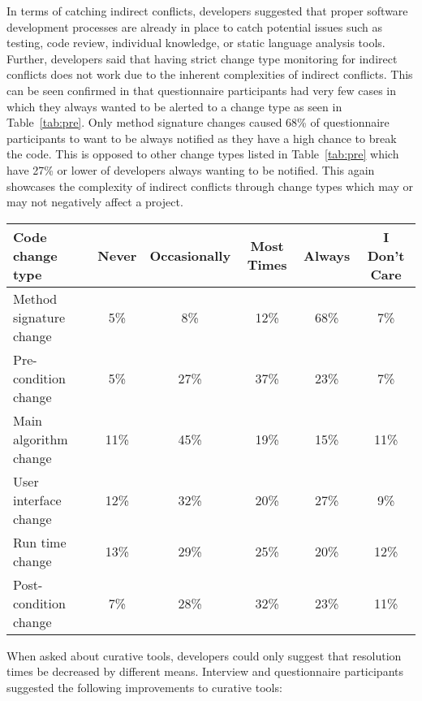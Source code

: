 In terms of catching indirect conflicts, developers suggested that proper software development processes
are already in place to catch potential issues such as testing, code review,
individual knowledge, or static language analysis tools. Further, developers said that having strict change type monitoring
for indirect conflicts does not work due to the inherent complexities of indirect conflicts.
This can be seen confirmed in that questionnaire participants had very few cases in which they always wanted to be
alerted to a change type as seen in Table~\ref{tab:pre}. Only method signature changes caused 68\% of questionnaire participants
to want to be always notified as they have a high chance to break the code. This is opposed to other change types listed in
Table~\ref{tab:pre} which have 27\% or lower of developers always wanting to be notified. This again showcases the
complexity of indirect conflicts through change types which may or may not negatively affect a project.

\begin{table*}[tb!]
\begin{center}
\begin{tabular}{| p{3cm} | c | c | c | c | c |}
\hline
Code change type &Never  & Occasionally & Most Times & Always & I Don't Care \\
\hline
\hline
Method signature change & 5\% & 8\% & 12\% & 68\% & 7\% \\ \hline
Pre-condition change & 5\% & 27\% & 37\% & 23\% & 7\% \\ \hline
Main algorithm change & 11\% & 45\% & 19\% & 15\% & 11\% \\ \hline
User interface change & 12\% & 32\% & 20\% & 27\% & 9\% \\ \hline
Run time change & 13\% & 29\% & 25\% & 20\% & 12\% \\ \hline
Post-condition change & 7\% & 28\% & 32\% & 23\% & 11\% \\ \hline
\end{tabular}
\end{center}
\caption{Questionnaire results about source code changes that developers deem notification worthy, in terms of percentage
of questionnaire participants.\label{tab:pre}}
\end{table*}

When asked about curative tools, developers could only suggest that resolution times be decreased by different means.
Interview and questionnaire participants suggested the following improvements to curative tools:

